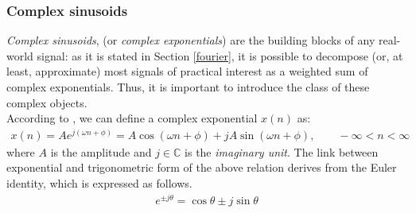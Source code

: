 \subsubsection{Complex sinusoids}
\textit{Complex sinusoids}, (or \textit{complex exponentials}) are the building blocks of any real-world signal: as it is stated in Section \ref{fourier}, it is possible to decompose (or, at least, approximate) most signals of practical interest as a weighted sum of complex exponentials. Thus, it is important to introduce the class of these complex objects. \\
According to \cite{proakis2006dimitris}, we can define a complex exponential $x(n)$ as:
\begin{align}
	x(n) =  A e^{j(\omega n + \phi)} = A \cos(\omega n + \phi) + j A \sin(\omega n + \phi), \qquad -\infty < n < \infty
\end{align}
\noindent where $A$ is the amplitude and $j \in \mathbb{C}$ is the \textit{imaginary unit}. The link between exponential and trigonometric form of the above relation derives from the Euler identity, which is expressed as follows.
\begin{align}
e^{\pm j \theta}=\cos \theta \pm j \sin \theta
\end{align}

